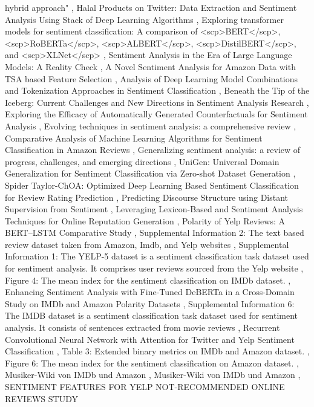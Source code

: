 \documentclass{article}
\begin{document}
hybrid approach" \cite{islam2024challenges02fd95a5}, Halal Products on Twitter: Data Extraction and Sentiment Analysis Using Stack of Deep Learning Algorithms \cite{feizollah2019halalf402d6f1}, Exploring transformer models for sentiment classification: A comparison of <scp>BERT</scp>, <scp>RoBERTa</scp>, <scp>ALBERT</scp>, <scp>DistilBERT</scp>, and <scp>XLNet</scp> \cite{areshey2024exploring4f38bf39}, Sentiment Analysis in the Era of Large Language Models: A Reality Check \cite{zhang2023sentimentb4b66e57}, A Novel Sentiment Analysis for Amazon Data with TSA based Feature Selection \cite{daniel2021novel127fb151}, Analysis of Deep Learning Model Combinations and Tokenization Approaches in Sentiment Classification \cite{erkan2023analysis6633bdc1}, Beneath the Tip of the Iceberg: Current Challenges and New Directions in Sentiment Analysis Research \cite{poria2020beneath22cf40d2}, Exploring the Efficacy of Automatically Generated Counterfactuals for Sentiment Analysis \cite{yang2021exploring1e053e64}, Evolving techniques in sentiment analysis: a comprehensive review \cite{kumar2025evolving5a044b19}, Comparative Analysis of Machine Learning Algorithms for Sentiment Classification in Amazon Reviews \cite{yu2024comparative4e50d20b}, Generalizing sentiment analysis: a review of progress, challenges, and emerging directions \cite{alahmadi2025generalizing369ede0a}, UniGen: Universal Domain Generalization for Sentiment Classification via Zero-shot Dataset Generation \cite{choi2024unigen4fb2ffdf}, Spider Taylor-ChOA: Optimized Deep Learning Based Sentiment Classification for Review Rating Prediction \cite{banbhrani2022spiderd7fe2b64}, Predicting Discourse Structure using Distant Supervision from Sentiment \cite{huber2019predictingfa36d1ac}, Leveraging Lexicon-Based and Sentiment Analysis Techniques for Online Reputation Generation \cite{boumhidi2021leveraging6c43877c}, Polarity of Yelp Reviews: A BERT–LSTM Comparative Study \cite{belaroussi2025polarity26a67026}, Supplemental Information 2: The text based review dataset taken from Amazon, Imdb, and Yelp websites \cite{paperndsupplementald5b276ae}, Supplemental Information 1: The YELP-5 dataset is a sentiment classification task dataset used for sentiment analysis. It comprises user reviews sourced from the Yelp website \cite{paperndsupplemental8b6472a3}, Figure 4: The mean index for the sentiment classification on IMDb dataset. \cite{paperndfigure92a99ba4}, Enhancing Sentiment Analysis with Fine-Tuned DeBERTa in a Cross-Domain Study on IMDb and Amazon Polarity Datasets \cite{cao2025enhancing52f2345f}, Supplemental Information 6: The IMDB dataset is a sentiment classification task dataset used for sentiment analysis. It consists of sentences extracted from movie reviews \cite{paperndsupplementale2a50a6f}, Recurrent Convolutional Neural Network with Attention for Twitter and Yelp Sentiment Classification \cite{wen2018recurrent306cb42f}, Table 3: Extended binary metrics on IMDb and Amazon dataset. \cite{paperndtableaaf66ed6}, Figure 6: The mean index for the sentiment classification on Amazon dataset. \cite{paperndfigure967211c9}, Musiker-Wiki von IMDb und Amazon \cite{gehring2008musikerwikice99da7d}, Musiker-Wiki von IMDb und Amazon \cite{gehring2008musikerwiki92fe96c0}, SENTIMENT FEATURES FOR YELP NOT-RECOMMENDED ONLINE REVIEWS STUDY 
\end{document}
